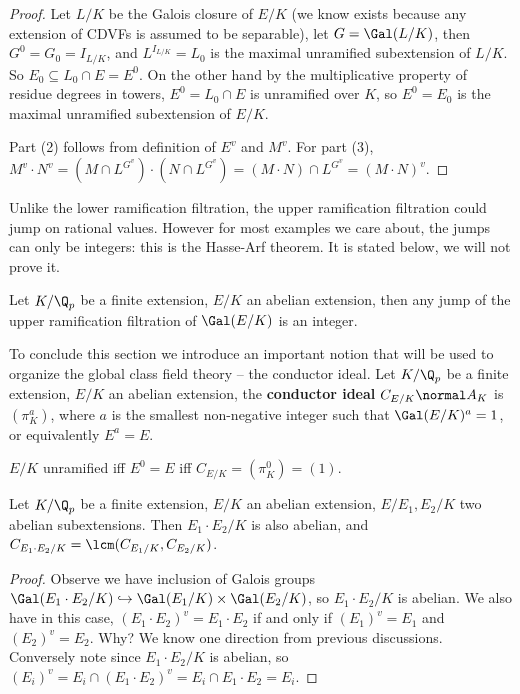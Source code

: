 \documentclass[11pt]{amsart}
\begin{document}
\begin{proof}
    Let $L/K$ be the Galois closure of $E/K$ (we know exists because any
    extension of CDVFs is assumed to be separable), let $G = \Gal(L/K)$, then
    $G^0 = G_0 = I_{L/K}$, and $L^{I_{L/K}} = L_0$ is the maximal unramified
    subextension of $L/K$.  So $E_0 \subseteq L_0 \cap E = E^0$.  On the other hand by
    the multiplicative property of residue degrees in towers, $E^0 = L_0 \cap E$
    is unramified over $K$, so $E^0 = E_0$ is the maximal unramified
    subextension of $E/K$.

    Part (2) follows from definition of $E^v$ and $M^v$.  For part (3), $M^v
    \cdot N^v = (M \cap L^{G^v}) \cdot (N \cap L^{G^v}) = (M \cdot N) \cap
    L^{G^v} = (M \cdot N)^v$.
\end{proof}

\bigskip

Unlike the lower ramification filtration, the upper ramification filtration
could jump on rational values.  However for most examples we care about, the
jumps can only be integers: this is the Hasse-Arf theorem.  It is stated below,
we will not prove it.

\begin{thm}
    Let $K/\Q_p$ be a finite extension, $E/K$ an abelian extension, then any
    jump of the upper ramification filtration of $\Gal(E/K)$ is an integer.
\end{thm}

To conclude this section we introduce an important notion that will be used to
organize the global class field theory -- the conductor ideal.  Let $K/\Q_p$ be
a finite extension, $E/K$ an abelian extension, the {\bf conductor ideal}
 $C_{E/K} \normal A_K$ is $(\pi_K^a)$, where $a$
is the smallest non-negative integer such that $\Gal(E/K)^a = 1$, or
equivalently $E^a = E$.

\begin{remark}
    $E/K$ unramified iff $E^0 = E$ iff $C_{E/K} = (\pi_K^0) = (1)$.
\end{remark}

\begin{prop}
    Let $K/\Q_p$ be a finite extension, $E/K$ an abelian extension, $E/E_1,
    E_2/K$ two abelian subextensions.  Then $E_1 \cdot E_2/K$ is also abelian,
    and $C_{E_1 \cdot E_2 / K} = \lcm(C_{E_1/K}, C_{E_2/K})$.
\end{prop}

\begin{proof}
    Observe we have inclusion of Galois groups $\Gal(E_1 \cdot E_2/K)
    \hookrightarrow \Gal(E_1/K) \times \Gal(E_2/K)$, so $E_1 \cdot E_2/K$ is
    abelian.  We also have in this case, $(E_1 \cdot E_2)^v = E_1 \cdot E_2$ if
    and only if $(E_1)^v = E_1$ and $(E_2)^v = E_2$.  Why? We know one direction
    from previous discussions.  Conversely note since $E_1 \cdot E_2/K$ is
    abelian, so $(E_i)^v = E_i \cap (E_1 \cdot E_2)^v = E_i \cap E_1 \cdot E_2 =
    E_i$.
\end{proof}
\end{document}

